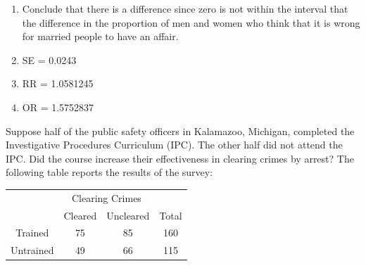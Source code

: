 \documentclass[11pt, chapterprefix=true]{scrbook}\usepackage[]{graphicx}\usepackage[]{color}
\begin{document}
\begin{exercises}
\begin{exercise}
	\end{exercise}
	\begin{solution}



	  \begin{enumerate}
	  \item Conclude that there is a difference since zero is not within the interval that the difference in the proportion of men and women who think that it is wrong for married people to have an affair.
	  \item SE = 0.0243
	  \item RR = 1.0581245
	  \item OR = 1.5752837
	  \end{enumerate}

	\end{solution}

  \begin{exercise} %

      Suppose half of the public safety officers in Kalamazoo, Michigan, completed the Investigative Procedures Curriculum (IPC).  The other half did not attend the IPC.  Did the course increase their effectiveness in clearing crimes by arrest?  The following table reports the results of the survey:

\vspace{2mm}


\begin{table}[ht]
\centering
\begin{tabular}{@{} cccc @{}} \hline
 & \multicolumn{2}{c}{Clearing Crimes} \\
 & Cleared & Uncleared & Total \\ \hline
Trained & 75 & 85 & 160 \\
Untrained & 49 & 66 & 115 \\ \hline
\end{tabular}
\end{table}



\end{exercise}
\end{exercises}
\end{document}
